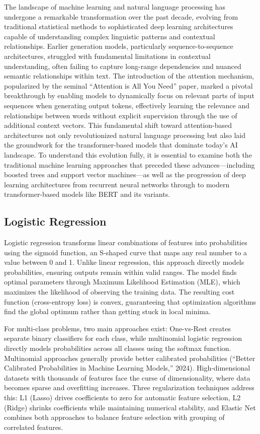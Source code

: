 \documentclass[
  titlepage]{article}
\begin{document}
The landscape of machine learning and natural language processing has
undergone a remarkable transformation over the past decade, evolving
from traditional statistical methods to sophisticated deep learning
architectures capable of understanding complex linguistic patterns and
contextual relationships. Earlier generation models, particularly
sequence-to-sequence architectures, struggled with fundamental
limitations in contextual understanding, often failing to capture
long-range dependencies and nuanced semantic relationships within text.
The introduction of the attention mechanism, popularized by the seminal
``Attention is All You Need'' paper, marked a pivotal breakthrough by
enabling models to dynamically focus on relevant parts of input
sequences when generating output tokens, effectively learning the
relevance and relationships between words without explicit supervision
through the use of additional context vectors. This fundamental shift
toward attention-based architectures not only revolutionized natural
language processing but also laid the groundwork for the
transformer-based models that dominate today's AI landscape. To
understand this evolution fully, it is essential to examine both the
traditional machine learning approaches that preceded these
advances---including boosted trees and support vector machines---as well
as the progression of deep learning architectures from recurrent neural
networks through to modern transformer-based models like BERT and its
variants.

\subsection{Logistic Regression}\label{logistic-regression}

Logistic regression transforms linear combinations of features into
probabilities using the sigmoid function, an S-shaped curve that maps
any real number to a value between 0 and 1. Unlike linear regression,
this approach directly models probabilities, ensuring outputs remain
within valid ranges. The model finds optimal parameters through Maximum
Likelihood Estimation (MLE), which maximizes the likelihood of observing
the training data. The resulting cost function (cross-entropy loss) is
convex, guaranteeing that optimization algorithms find the global
optimum rather than getting stuck in local minima.

For multi-class problems, two main approaches exist: One-vs-Rest creates
separate binary classifiers for each class, while multinomial logistic
regression directly models probabilities across all classes using the
softmax function. Multinomial approaches generally provide better
calibrated probabilities ({``Better Calibrated Probabilities in Machine
Learning Models,''} 2024). High-dimensional datasets with thousands of
features face the curse of dimensionality, where data becomes sparse and
overfitting increases. Three regularization techniques address this: L1
(Lasso) drives coefficients to zero for automatic feature selection, L2
(Ridge) shrinks coefficients while maintaining numerical stability, and
Elastic Net combines both approaches to balance feature selection with
grouping of correlated features.
\end{document}
